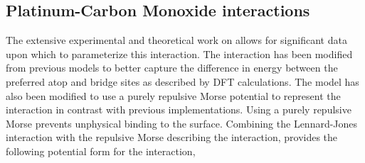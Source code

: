 
\subsection{Platinum-Carbon Monoxide interactions} The extensive experimental
\citep{Ertl:1977cg, Kelemen:1979ad, Ertl:1989, Schweizer:1989fk, Szanyi:1992aa,
Yeo:1997th} and theoretical \citep{Feibelman:2001qa, Deshlahra:2009wu,
Beurden:2002ys, Deshlahra:2012aa, Korzeniewski:1986kl, Mason:2004ix} work on
 allows for significant data upon which to parameterize this
interaction.  The  interaction has been
modified from previous models\citep{Michalka:2013aa, Michalka:2015aa} to better
capture the difference in energy between the preferred atop and bridge sites as
described by DFT calculations.\citep{Deshlahra:2012aa} The model has also been
modified to use a purely repulsive Morse potential to represent the
 interaction in contrast with previous
implementations.\citep{Korzeniewski:1986kl, Michalka:2013aa} Using a purely
repulsive Morse prevents unphysical  binding to the surface.
Combining the Lennard-Jones  interaction with the repulsive
Morse describing the  interaction, provides the following
potential form for the  interaction,


